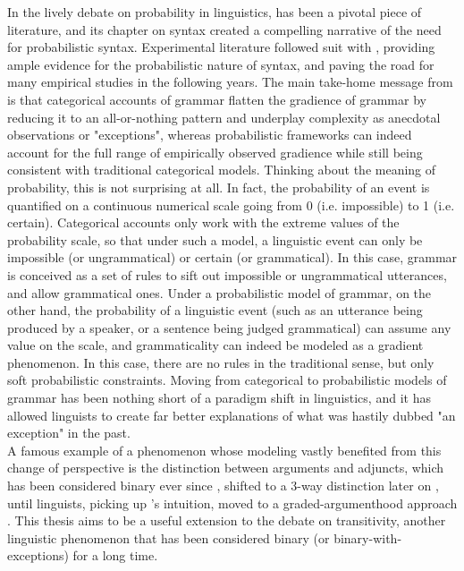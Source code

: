 In the lively debate on probability in linguistics, \textcite{bod2003probabilistic} has been a pivotal piece of literature, and its chapter on syntax \parencite{manning2003probabilistic} created a compelling narrative of the need for probabilistic syntax. Experimental literature followed suit with \textcite{bresnan2007probabilistic, BresnanHay2008}, providing ample evidence for the probabilistic nature of syntax, and paving the road for many empirical studies in the following years. The main take-home message from \textcite{manning2003probabilistic} is that categorical accounts of grammar flatten the gradience of grammar by reducing it to an all-or-nothing pattern and underplay complexity as anecdotal observations or "exceptions", whereas probabilistic frameworks can indeed account for the full range of empirically observed gradience while still being consistent with traditional categorical models. Thinking about the meaning of probability, this is not surprising at all. In fact, the probability of an event is quantified on a continuous numerical scale going from 0 (i.e. impossible) to 1 (i.e. certain). Categorical accounts only work with the extreme values of the probability scale, so that under such a model, a linguistic event can only be impossible (or ungrammatical) or certain (or grammatical). In this case, grammar is conceived as a set of rules to sift out impossible or ungrammatical utterances, and allow grammatical ones. Under a probabilistic model of grammar, on the other hand, the probability of a linguistic event (such as an utterance being produced by a speaker, or a sentence being judged grammatical) can assume any value on the scale, and grammaticality can indeed be modeled as a gradient phenomenon. In this case, there are no rules in the traditional sense, but only soft probabilistic constraints. Moving from categorical to probabilistic models of grammar has been nothing short of a paradigm shift in linguistics, and it has allowed linguists to create far better explanations of what was hastily dubbed "an exception" in the past.\\
A famous example of a phenomenon whose modeling vastly benefited from this change of perspective is the distinction between arguments and adjuncts, which has been considered binary ever since \textcite{tesniere2015elements}, shifted to a 3-way distinction later on \parencite{vanvalinlapolla1997syntax, Dowty2003, AldezabalEtAl2002, Villavicencio2002}, until linguists, picking up \textcite{vater1978possibility}'s intuition, moved to a graded-argumenthood approach \parencite{CennamoLenci2019, KimEtAl2019, KimEtAl2019a, KimEtAl2018}. This thesis aims to be a useful extension to the debate on transitivity, another linguistic phenomenon that has been considered binary (or binary-with-exceptions) for a long time.
